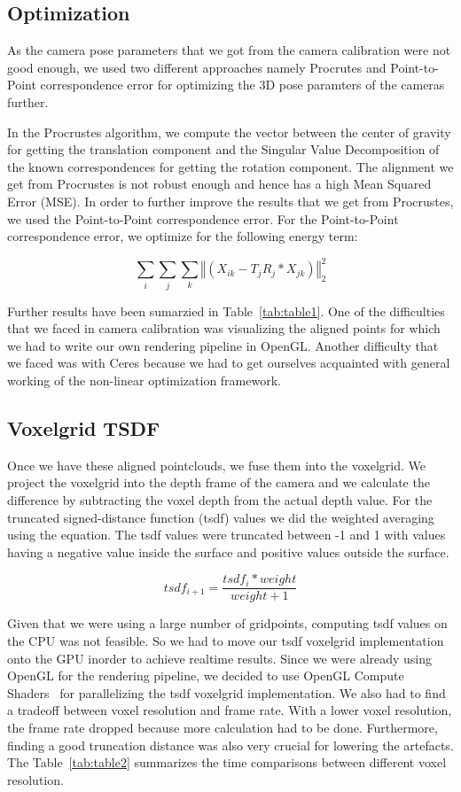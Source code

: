 \documentclass[10pt,twocolumn,letterpaper]{article}
\begin{document}
\subsection{Optimization}
As the camera pose parameters that we got from the camera calibration were not good enough, we used two different approaches namely Procrutes and Point-to-Point correspondence error for optimizing the 3D pose paramters of the cameras further.
 
In the Procrustes algorithm, we compute the vector between the center of gravity for getting the translation component and the Singular Value Decomposition of the known correspondences for getting the rotation component. The alignment we get from Procrustes is not robust enough and hence has a high Mean Squared Error (MSE). In order to further improve the results that we get from Procrustes, we used the Point-to-Point correspondence error. For the Point-to-Point correspondence error, we optimize for the following energy term:

$$
\sum_{i}\sum_{j}\sum_{k} \left\Vert\left(X_{ik} - T_jR_j*X_{jk}\right)\right\Vert_2^2
$$

Further results have been sumarzied in Table~\ref{tab:table1}. One of the difficulties that we faced in camera calibration was visualizing the aligned points for which we had to write our own rendering pipeline in OpenGL. Another difficulty that we faced was with Ceres because we had to get ourselves acquainted with general working of the non-linear optimization framework. 
\subsection{Voxelgrid TSDF}
Once we have these aligned pointclouds, we fuse them into the voxelgrid. We project the voxelgrid into the depth frame of the camera and we calculate the difference  by subtracting the voxel depth from the actual depth value. For the truncated signed-distance function (tsdf) values we did the weighted averaging using the equation. The tsdf values were truncated between -1 and 1 with values having a negative value inside the surface and positive values outside the surface.

$$
tsdf_{i+1}=\frac{tsdf_{i} * weight}{weight+1}
$$

Given that we were using a large number of gridpoints, computing tsdf values on the CPU was not feasible. So we had to move our tsdf voxelgrid implementation onto the GPU inorder to achieve realtime results. Since we were already using OpenGL for the rendering pipeline, we decided to use OpenGL Compute Shaders~\cite{Authors1} for parallelizing the tsdf voxelgrid implementation. We also had to find a tradeoff between voxel resolution and frame rate. With a lower voxel resolution, the frame rate dropped because more calculation had to be done. Furthermore, finding a good truncation distance was also very crucial for lowering the artefacts. The Table~\ref{tab:table2} summarizes the time comparisons between different voxel resolution. 
\end{document}

